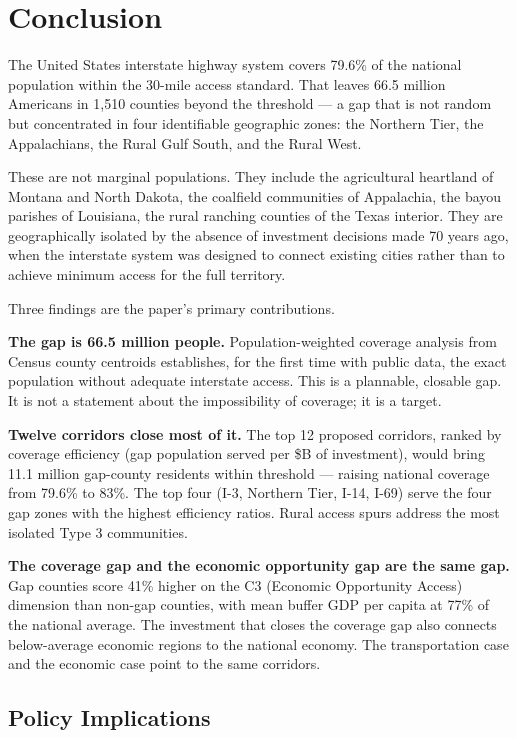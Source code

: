 \section{Conclusion}

The United States interstate highway system covers 79.6\% of the national population within the 30-mile access standard. That leaves 66.5 million Americans in 1,510 counties beyond the threshold --- a gap that is not random but concentrated in four identifiable geographic zones: the Northern Tier, the Appalachians, the Rural Gulf South, and the Rural West.

These are not marginal populations. They include the agricultural heartland of Montana and North Dakota, the coalfield communities of Appalachia, the bayou parishes of Louisiana, the rural ranching counties of the Texas interior. They are geographically isolated by the absence of investment decisions made 70 years ago, when the interstate system was designed to connect existing cities rather than to achieve minimum access for the full territory.

Three findings are the paper's primary contributions.

\textbf{The gap is 66.5 million people.} Population-weighted coverage analysis from Census county centroids establishes, for the first time with public data, the exact population without adequate interstate access. This is a plannable, closable gap. It is not a statement about the impossibility of coverage; it is a target.

\textbf{Twelve corridors close most of it.} The top 12 proposed corridors, ranked by coverage efficiency (gap population served per \$B of investment), would bring 11.1 million gap-county residents within threshold --- raising national coverage from 79.6\% to 83\%. The top four (I-3, Northern Tier, I-14, I-69) serve the four gap zones with the highest efficiency ratios. Rural access spurs address the most isolated Type 3 communities.

\textbf{The coverage gap and the economic opportunity gap are the same gap.} Gap counties score 41\% higher on the C3 (Economic Opportunity Access) dimension than non-gap counties, with mean buffer GDP per capita at 77\% of the national average. The investment that closes the coverage gap also connects below-average economic regions to the national economy. The transportation case and the economic case point to the same corridors.

\subsection*{Policy Implications}

